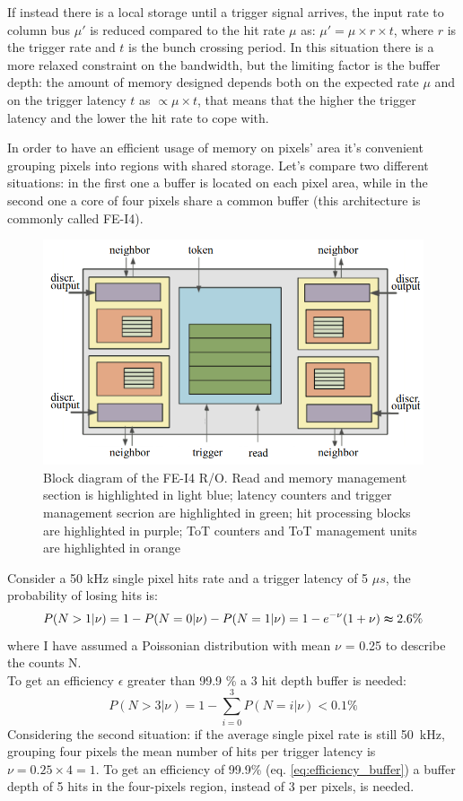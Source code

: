    If instead there is a local storage until a trigger signal arrives, the input rate to column bus $\mu '$ is reduced compared to the hit rate $\mu$ as: $\mu'=\mu \times r \times t$, where $r$ is the trigger rate and $t$ is the bunch crossing period.
   In this situation there is a more relaxed constraint on the bandwidth, but the limiting factor is the buffer depth: the  amount of memory designed depends both on the expected rate $\mu$ and on the trigger latency $t$ as $\propto\mu \times t$, that means that the higher the trigger latency and the lower the hit rate to cope with. 

   In order to have an efficient usage of memory on pixels' area it's convenient grouping pixels into regions with shared storage. Let's compare two different situations: in the first one a buffer is located on each pixel area, while in the second one a core of four pixels share a common buffer (this architecture is commonly called FE-I4). \\
   \begin{figure}[h!]
      \centering
      \includegraphics[width=.7\linewidth]{figures/Pixel_detectors/core.png}
      \caption{Block diagram of the FE-I4 R/O. Read and memory
      management section is highlighted in light blue; latency counters and
      trigger management secrion are highlighted in green; hit processing blocks
      are highlighted in purple; ToT counters and ToT management units are
      highlighted in orange}
      \label{fig:core}
   \end{figure}
   Consider a 50 kHz single pixel hits rate and a trigger latency of 5 $\mu s$, the probability of losing hits is: 
   \begin{equation}
      P(N > 1 | \nu) = 1-P(N = 0 | \nu) - P(N = 1 | \nu) = 1 - e^{-\nu} (1+\nu) \thickapprox 2.6 \% 
   \end{equation}    
   where I have assumed a Poissonian distribution with mean $\nu$ = 0.25 to describe the counts N.\\
   To get an efficiency $\epsilon$ greater than 99.9 \% a 3 hit depth buffer is needed: 
   \begin{equation}
      P(N > 3 | \nu) = 1-\sum_{i=0}^{3} P(N = i | \nu) < 0.1\%  
   \label{eq:efficiency_buffer}
   \end{equation} 
   Considering the second situation: if the average single pixel rate is still \SI{50}{kHz}, grouping four pixels the mean number of hits per trigger latency is $\nu = 0.25 \times 4 = 1$. To get an efficiency of 99.9\% (eq. \ref{eq:efficiency_buffer}) a buffer depth of 5 hits in the four-pixels region, instead of 3 per pixels, is needed. 

